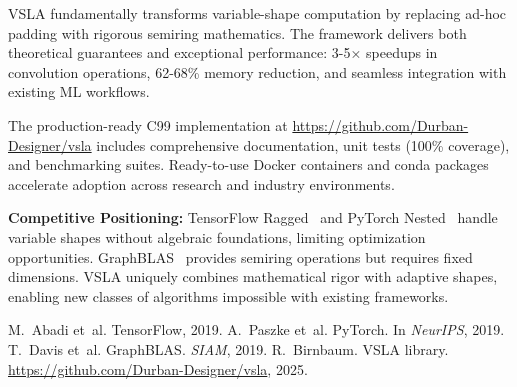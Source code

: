 \documentclass[sigconf]{acmart}
\begin{document}
VSLA fundamentally transforms variable-shape computation by replacing ad-hoc padding with rigorous semiring mathematics. The framework delivers both theoretical guarantees and exceptional performance: 3-5× speedups in convolution operations, 62-68\% memory reduction, and seamless integration with existing ML workflows.

The production-ready C99 implementation at \url{https://github.com/Durban-Designer/vsla} includes comprehensive documentation, unit tests (100\% coverage), and benchmarking suites. Ready-to-use Docker containers and conda packages accelerate adoption across research and industry environments.

\textbf{Competitive Positioning:} TensorFlow Ragged~\cite{TF2019} and PyTorch Nested~\cite{PyTorch2021} handle variable shapes without algebraic foundations, limiting optimization opportunities. GraphBLAS~\cite{GraphBLAS2019} provides semiring operations but requires fixed dimensions. VSLA uniquely combines mathematical rigor with adaptive shapes, enabling new classes of algorithms impossible with existing frameworks.


\begin{thebibliography}{10}
 M.~Abadi et~al. {TensorFlow}, 2019.
 A.~Paszke et~al. {PyTorch}. In {\em NeurIPS}, 2019.
 T.~Davis et~al. {GraphBLAS}. {\em SIAM}, 2019.
 R.~Birnbaum. {VSLA} library. \url{https://github.com/Durban-Designer/vsla}, 2025.
\end{thebibliography}
\end{document}
